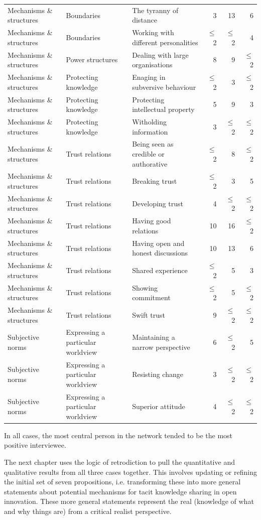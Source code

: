 \begin{landscape}
\begin{longtable}[c]{lllrrr}
Mechanisms \& structures & Boundaries & The tyranny of distance & 3 & 13 & 6 \\ 
Mechanisms \& structures & Boundaries & Working with different personalities & $\leq$ 2 & $\leq$ 2 & 4 \\ 
Mechanisms \& structures & Power structures & Dealing with large organisations & 8 & 9 & $\leq$ 2 \\ 
Mechanisms \& structures & Protecting knowledge & Enaging in subversive behaviour & $\leq$ 2 & 3 & $\leq$ 2 \\ 
Mechanisms \& structures & Protecting knowledge & Protecting intellectual property & 5 & 9 & 3 \\ 
Mechanisms \& structures & Protecting knowledge & Witholding information & 3 & $\leq$ 2 & $\leq$ 2 \\ 
Mechanisms \& structures & Trust relations & Being seen as credible or authorative & $\leq$ 2 & 8 & $\leq$ 2 \\ 
Mechanisms \& structures & Trust relations & Breaking trust & $\leq$ 2 & 3 & 5 \\ 
Mechanisms \& structures & Trust relations & Developing trust & 4 & $\leq$ 2 & $\leq$ 2 \\ 
Mechanisms \& structures & Trust relations & Having good relations & 10 & 16 & $\leq$ 2 \\ 
Mechanisms \& structures & Trust relations & Having open and honest discussions & 10 & 13 & 6 \\ 
Mechanisms \& structures & Trust relations & Shared experience & $\leq$ 2 & 5 & 3 \\ 
Mechanisms \& structures & Trust relations & Showing commitment & $\leq$ 2 & 5 & $\leq$ 2 \\ 
Mechanisms \& structures & Trust relations & Swift trust & 9 & $\leq$ 2 & $\leq$ 2 \\ 
Subjective norms & Expressing a particular worldview & Maintaining a narrow perspective & 6 & $\leq$ 2 & 5 \\ 
Subjective norms & Expressing a particular worldview & Resisting change & 3 & $\leq$ 2 & $\leq$ 2 \\ 
Subjective norms & Expressing a particular worldview & Superior attitude & 4 & $\leq$ 2 & $\leq$ 2 \\ 
\end{longtable}
\end{landscape}

In all cases, the most central person in the network tended to be the most positive interviewee. 

The next chapter uses the logic of retrodiction to pull the quantitative and qualitative results from all three cases together. This involves updating or refining the initial set of seven propositions, i.e. transforming these into more general statements about potential mechanisms for tacit knowledge sharing in open innovation. These more general statements represent the real (knowledge of what and why things are) from a critical realist perspective.
